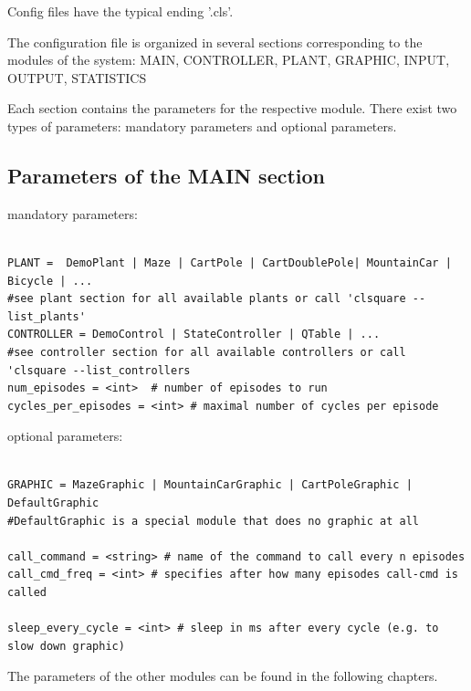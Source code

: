 \documentclass[a4paper,12pt,german]{article}
\begin{document}
Config files have the typical ending '.cls'.

The configuration file is organized in several sections corresponding to the modules of the
system: MAIN, CONTROLLER, PLANT, GRAPHIC, INPUT, OUTPUT, STATISTICS

Each section contains the parameters for the respective module. 
There exist two types of parameters: mandatory parameters and optional parameters.


\subsection{Parameters of the MAIN section}

mandatory parameters:

\begin{footnotesize}
\begin{verbatim}

PLANT =  DemoPlant | Maze | CartPole | CartDoublePole| MountainCar | Bicycle | ...
#see plant section for all available plants or call 'clsquare --list_plants'
CONTROLLER = DemoControl | StateController | QTable | ...
#see controller section for all available controllers or call 'clsquare --list_controllers
num_episodes = <int>  # number of episodes to run
cycles_per_episodes = <int> # maximal number of cycles per episode 

\end{verbatim}
\end{footnotesize}


optional parameters:

\begin{footnotesize}
\begin{verbatim}

GRAPHIC = MazeGraphic | MountainCarGraphic | CartPoleGraphic | DefaultGraphic
#DefaultGraphic is a special module that does no graphic at all

call_command = <string> # name of the command to call every n episodes
call_cmd_freq = <int> # specifies after how many episodes call-cmd is called

sleep_every_cycle = <int> # sleep in ms after every cycle (e.g. to slow down graphic)

\end{verbatim}
\end{footnotesize}

The parameters of the other modules can be found in the following chapters.
\end{document}
